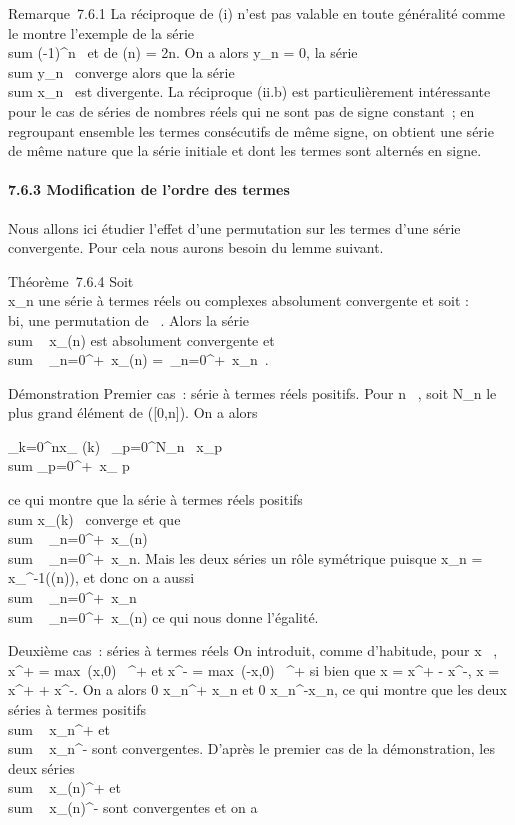 \documentclass[]{article}
\begin{document}
Remarque~7.6.1 La réciproque de (i) n'est pas valable en toute
généralité comme le montre l'exemple de la série
\\sum  (-1)^n~
et de \phi(n) = 2n. On a alors y\_n = 0, la série
\\sum  y\_n~
converge alors que la série
\\sum  x\_n~ est
divergente. La réciproque (ii.b) est particulièrement intéressante pour
le cas de séries de nombres réels qui ne sont pas de signe constant~; en
regroupant ensemble les termes consécutifs de même signe, on obtient une
série de même nature que la série initiale et dont les termes sont
alternés en signe.

\paragraph{7.6.3 Modification de l'ordre des termes}

Nous allons ici étudier l'effet d'une permutation sur les termes d'une
série convergente. Pour cela nous aurons besoin du lemme suivant.

Théorème~7.6.4 Soit \\\sum
 x\_n une série à termes réels ou complexes absolument
convergente et soit \sigma : ~ \rightarrow~ ~ bi\jmathective, une permutation de ~. Alors la
série \\sum ~
x\_\sigma(n) est absolument convergente et
\\sum ~
\_n=0^+\infty~x\_\sigma(n) =\
\sum  \_n=0^+\infty~x\_n~.

Démonstration Premier cas~: série à termes réels positifs. Pour n \in {}~,
soit N\_n le plus grand élément de \sigma({[}0,n{]}). On a alors

\sum \_k=0^nx\_ \sigma(k)~
\leq\sum \_p=0^N\_n~
x\_p \leq\\sum
\_p=0^+\infty~x\_ p

ce qui montre que la série à termes réels positifs
\\sum  x\_\sigma(k)~
converge et que \\sum ~
\_n=0^+\infty~x\_\sigma(n)
\leq\\sum ~
\_n=0^+\infty~x\_n. Mais les deux séries \jmathouent un rôle
symétrique puisque x\_n = x\_\sigma^-1(\sigma(n)), et
donc on a aussi \\sum ~
\_n=0^+\infty~x\_n
\leq\\sum ~
\_n=0^+\infty~x\_\sigma(n) ce qui nous donne l'égalité.

Deuxième cas~: séries à termes réels On introduit, comme d'habitude,
pour x \in {}~, x^+ = max~(x,0) \in
{}~^+ et x^- = max~(-x,0) \in
\mathbb{R}~^+ si bien que x = x^+ - x^-,
\textbar{}x\textbar{} = x^+ + x^-. On a alors 0 \leq
x\_n^+ \leq\textbar{}x\_n\textbar{} et 0 \leq
x\_n^-\leq\textbar{}x\_n\textbar{}, ce qui montre
que les deux séries à termes positifs
\\sum ~
x\_n^+ et
\\sum ~
x\_n^- sont convergentes. D'après le premier cas de la
démonstration, les deux séries
\\sum ~
x\_\sigma(n)^+ et
\\sum ~
x\_\sigma(n)^- sont convergentes et on a
\end{document}
